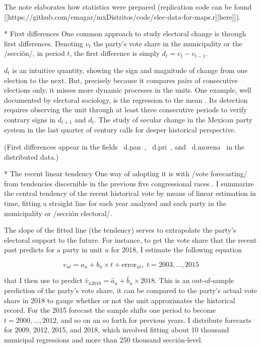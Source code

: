 \documentclass[letter,12pt]{article}
\begin{document}
The note elaborates how statistics were prepared (replication code can be found [[https://github.com/emagar/mxDistritos/code/elec-data-for-maps.r][here]]).



* First differences
One common approach to study electoral change is through first differences. Denoting $v_t$ the party's vote share in the municipality or the /sección/, in period $t$, the first difference is simply $d_t = v_t - v_{t-1}$. 

$d_t$ is an intuitive quantity, showing the sign and magnitude of change from one election to the next. But, precisely because it compares pairs of consecutive elections only, it misses more dynamic processes in the units. One example, well documented by electoral sociology, is the regression to the mean \citep{campbell.1991,segovia.els1979}. Its detection requires observing the unit through at least three consecutive periods to verify contrary signs in $d_{t+1}$ and $d_t$. The study of secular change in the Mexican party system in the last quarter of century calls for deeper historical perspective. 

(First differences appear in the fields ~d.pan~, ~d.pri~, and ~d.morena~ in the distributed data.)

* The recent linear tendency
One way of adopting it is with /vote forecasting/ from tendencies discernible in the previous five congressional races \citep{magar.gubCoatMx.2012}. I summarize the central tendency of the recent historical vote by means of linear estimation in time, fitting a straight line for each year analyzed and each party in the municipality or /sección electoral/. 

The slope of the fitted line (the tendency) serves to extrapolate the party's electoral support to the future. For instance, to get the vote share that the recent past predicts for a party in unit $u$ for 2018, I estimate the following equation 

\begin{equation}
v_{ut} = a_u + b_u \times t + \text{error}_{ut}, \; t = 2003, \ldots, 2015
\end{equation}\label{ts-eq}

that I then use to predict $\hat{v}_{u2018} = \hat{a}_u + \hat{b}_u \times 2018$. This is an out-of-sample prediction of the party's vote share, it can be compared to the party's actual vote share in 2018 to gauge whether or not the unit approximates the historical record. For the 2015 forecast the sample shifts one period to become $t = 2000, \ldots, 2012$, and so on an so forth for previous years. I distribute forecasts for 2009, 2012, 2015, and 2018, which involved fitting about 10 thousand municipal regressions and more than 250 thousand sección-level.
\end{document}
